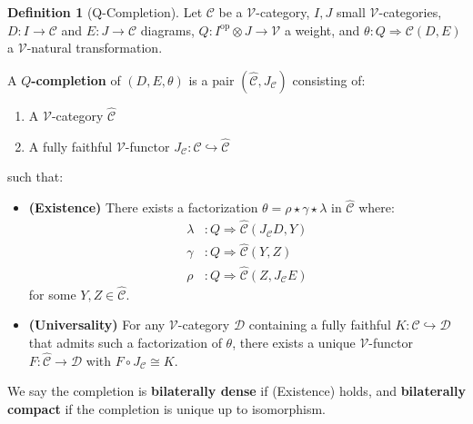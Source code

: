 \documentclass[11pt]{article}
\theoremstyle{plain}
\theoremstyle{definition}
\newtheorem{definition}[theorem]{Definition}
\theoremstyle{remark}
\newcommand{\V}{\mathcal{V}}
\newcommand{\op}{\mathrm{op}}
\begin{document}
\begin{definition}[Q-Completion]
Let $\mathcal{C}$ be a $\V$-category, $I, J$ small $\V$-categories, $D : I \to \mathcal{C}$ and $E : J \to \mathcal{C}$ diagrams, $Q : I^{\op} \otimes J \to \V$ a weight, and $\theta : Q \Rightarrow \mathcal{C}(D,E)$ a $\V$-natural transformation.

A \textbf{$Q$-completion} of $(D, E, \theta)$ is a pair $(\widehat{\mathcal{C}}, J_{\mathcal{C}})$ consisting of:
\begin{enumerate}
\item A $\V$-category $\widehat{\mathcal{C}}$
\item A fully faithful $\V$-functor $J_{\mathcal{C}} : \mathcal{C} \hookrightarrow \widehat{\mathcal{C}}$
\end{enumerate}
such that:

\begin{itemize}
\item \textbf{(Existence)} There exists a factorization $\theta = \rho \star \gamma \star \lambda$ in $\widehat{\mathcal{C}}$ where:
\begin{align}
\lambda &: Q \Rightarrow \widehat{\mathcal{C}}(J_{\mathcal{C}} D, Y) \\
\gamma &: Q \Rightarrow \widehat{\mathcal{C}}(Y, Z) \\
\rho &: Q \Rightarrow \widehat{\mathcal{C}}(Z, J_{\mathcal{C}} E)
\end{align}
for some $Y, Z \in \widehat{\mathcal{C}}$.

\item \textbf{(Universality)} For any $\V$-category $\mathcal{D}$ containing a fully faithful $K : \mathcal{C} \hookrightarrow \mathcal{D}$ that admits such a factorization of $\theta$, there exists a unique $\V$-functor $F : \widehat{\mathcal{C}} \to \mathcal{D}$ with $F \circ J_{\mathcal{C}} \cong K$.
\end{itemize}

We say the completion is \textbf{bilaterally dense} if (Existence) holds, and \textbf{bilaterally compact} if the completion is unique up to isomorphism.
\end{definition}

\begin{center}
\end{center}
\end{document}
